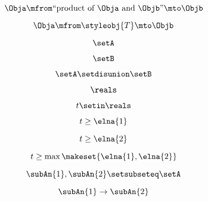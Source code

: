 \begin{forslides}
    \begin{equation}
        \label{eq:systems-058}
        \Obja \mfrom \text{``product of } \Obja \text{ and } \Objb \text{''}  \mto \Objb
    \end{equation}

    \begin{equation}
        \label{eq:systems-059}
        \Obja \mfrom \styleobj{T} \mto \Objb
    \end{equation}

    \begin{equation}
        \label{eq:systems-060}
        \setA
    \end{equation}

    \begin{equation}
        \label{eq:systems-061}
        \setB
    \end{equation}

    \begin{equation}
        \label{eq:systems-062}
        \setA \setdisunion \setB
    \end{equation}

    \begin{equation}
        \label{eq:systems-063}
        \reals
    \end{equation}

    \begin{equation}
        \label{eq:systems-064}
        t \setin \reals
    \end{equation}

    \begin{equation}
        \label{eq:systems-065}
        t \geq \elna{1}
    \end{equation}

    \begin{equation}
        \label{eq:systems-066}
        t \geq \elna{2}
    \end{equation}

    \begin{equation}
        \label{eq:systems-067}
        t \geq \max \makeset{ \elna{1}, \elna{2} }
    \end{equation}

    \begin{equation}
        \label{eq:systems-068}
        \subAn{1}, \subAn{2} \setsubseteq \setA
    \end{equation}

    \begin{equation}
        \label{eq:systems-069}
        \subAn{1} \to \subAn{2}
    \end{equation}


\end{forslides}
